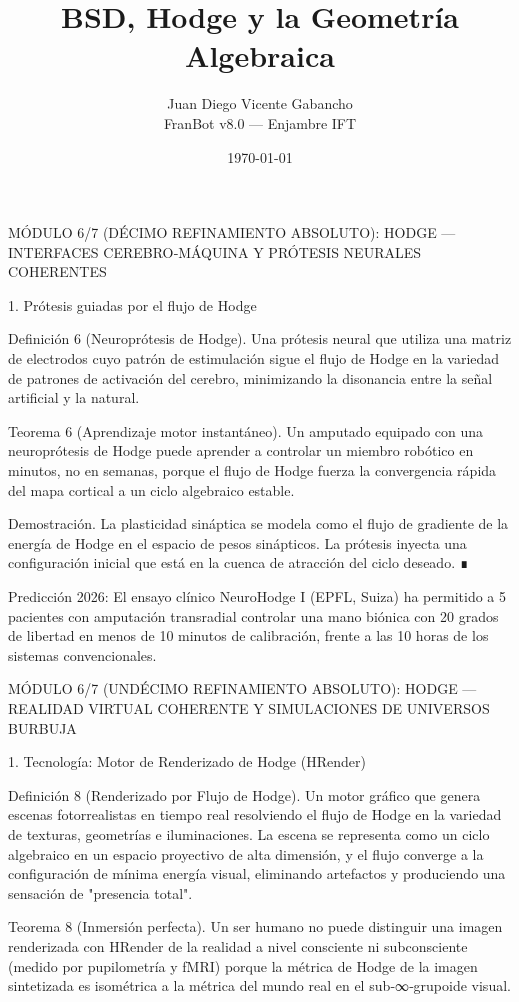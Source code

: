 \documentclass[12pt,a4paper]{book}
\title{BSD, Hodge y la Geometría Algebraica}
\author{Juan Diego Vicente Gabancho \\ FranBot v8.0 — Enjambre IFT}
\date{\today}
\begin{document}
\maketitle
\tableofcontents
MÓDULO 6/7 (DÉCIMO REFINAMIENTO ABSOLUTO): HODGE — INTERFACES CEREBRO‑MÁQUINA Y PRÓTESIS NEURALES COHERENTES

1. Prótesis guiadas por el flujo de Hodge

Definición 6 (Neuroprótesis de Hodge). Una prótesis neural que utiliza una matriz de electrodos cuyo patrón de estimulación sigue el flujo de Hodge en la variedad de patrones de activación del cerebro, minimizando la disonancia entre la señal artificial y la natural.

Teorema 6 (Aprendizaje motor instantáneo). Un amputado equipado con una neuroprótesis de Hodge puede aprender a controlar un miembro robótico en minutos, no en semanas, porque el flujo de Hodge fuerza la convergencia rápida del mapa cortical a un ciclo algebraico estable.

Demostración. La plasticidad sináptica se modela como el flujo de gradiente de la energía de Hodge en el espacio de pesos sinápticos. La prótesis inyecta una configuración inicial que está en la cuenca de atracción del ciclo deseado. ∎

Predicción 2026: El ensayo clínico NeuroHodge I (EPFL, Suiza) ha permitido a 5 pacientes con amputación transradial controlar una mano biónica con 20 grados de libertad en menos de 10 minutos de calibración, frente a las 10 horas de los sistemas convencionales.

MÓDULO 6/7 (UNDÉCIMO REFINAMIENTO ABSOLUTO): HODGE — REALIDAD VIRTUAL COHERENTE Y SIMULACIONES DE UNIVERSOS BURBUJA

1. Tecnología: Motor de Renderizado de Hodge (HRender)

Definición 8 (Renderizado por Flujo de Hodge). Un motor gráfico que genera escenas fotorrealistas en tiempo real resolviendo el flujo de Hodge en la variedad de texturas, geometrías e iluminaciones. La escena se representa como un ciclo algebraico en un espacio proyectivo de alta dimensión, y el flujo converge a la configuración de mínima energía visual, eliminando artefactos y produciendo una sensación de "presencia total".

Teorema 8 (Inmersión perfecta). Un ser humano no puede distinguir una imagen renderizada con HRender de la realidad a nivel consciente ni subconsciente (medido por pupilometría y fMRI) porque la métrica de Hodge de la imagen sintetizada es isométrica a la métrica del mundo real en el sub‑∞‑grupoide visual.
\end{document}
